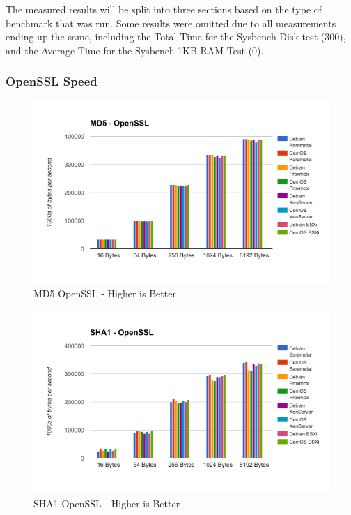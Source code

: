\documentclass[12pt]{spieman}  %
\begin{document}
The measured results will be split into three sections based on the type of benchmark that was run. Some results were omitted due to all measurements ending up the same, including the Total Time for the Sysbench Disk test (300), and the Average Time for the Sysbench 1KB RAM Test (0).

\subsubsection{OpenSSL Speed}

\begin{figure}[H]
\caption{MD5 OpenSSL - Higher is Better}
\centering
\includegraphics[width=\textwidth,keepaspectratio]{Graphs/MD5-OpenSSL}
\end{figure}

\begin{figure}[H]
\caption{SHA1 OpenSSL - Higher is Better}
\centering
\includegraphics[width=\textwidth,keepaspectratio]{Graphs/SHA1-OpenSSL}
\end{figure}
\end{document}
